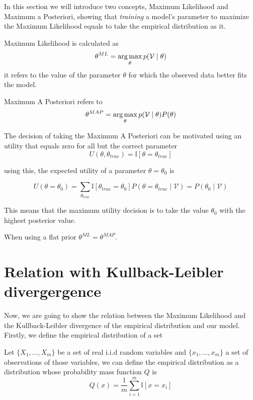 
In this section we will introduce two concepts, Maximum Likelihood and Maximum a
Posteriori, showing that \emph{training} a model's parameter to maximize the
Maximum Likelihood equals to take the empirical distribution as it.

\begin{definition}
  Maximum Likelihood is calculated as
  \[
    \theta^{ML} = \operatorname*{arg\,max}_\theta p(\mathcal{V} \mid \theta)
  \]
   it refers to the value of the parameter
\(\theta\) for which the observed data better fits the model.
\end{definition}

\begin{definition}
  Maximum A Posteriori refers to
  \[
    \theta^{MAP} = \operatorname*{arg\,max}_\theta p(\mathcal{V} \mid \theta)P(\theta)
  \]
\end{definition}

The decision of taking the Maximum A Posteriori can be motivated using an
utility that equals zero for all but the correct parameter
\[
  U(\theta, \theta_{true}) = \mathbb{I}[\theta = \theta_{true}]
\]

using this, the expected utility of a parameter \(\theta = \theta_0\) is

\[
  U(\theta = \theta_0) = \sum_{\theta_{true}}\mathbb{I}[\theta_{true} = \theta_0]P(\theta = \theta_{true}  \mid  \mathcal{V}) = P(\theta_0  \mid  \mathcal{V})
\]

This means that the maximum utility decision is to take the value \(\theta_0\)
with the highest posterior value.

\begin{remark}
When using a flat prior \(\theta^{ML}= \theta ^{MAP}\).
\end{remark}

\section{Relation with Kullback-Leibler divergergence}

Now, we are going to show the relation between the Maximum Likelihood and the
Kullback-Leibler divergence of the empirical distribution and our model.
Firstly, we define the empirical distribution of a set

Let \(\{X_1, \dots, X_m\}\) be a set of real i.i.d random variables and
\(\{x_{1}, \dots, x_{m}\}\) a set of observations of those variables, we can define the
empirical distribution as a distribution whose probability mass function
\(Q\) is
\[
  Q(x) = \frac{1}{m}\sum_{i = 1}^m \mathbb{I}[x = x_i]
\]

